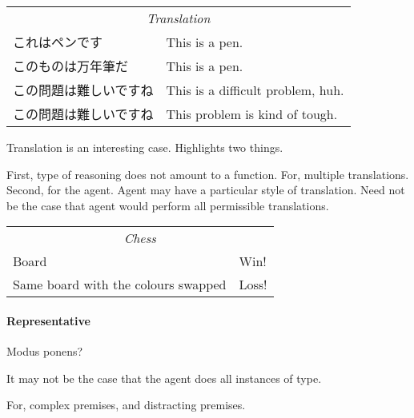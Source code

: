 \begin{note}
  \begin{center}
    \begin{tabular}[h]{p{.55\linewidth}|p{.4\linewidth}}
      \multicolumn{2}{c}{\emph{Translation}} \\
      これはペンです & This is a pen. \\
      このものは万年筆だ & This is a pen. \\
      この問題は難しいですね & This is a difficult problem, huh. \\
      この問題は難しいですね & This problem is kind of tough. \\
    \end{tabular}
  \end{center}

  Translation is an interesting case.
  Highlights two things.

  First, type of reasoning does not amount to a function.
  For, multiple translations.
  Second, for the agent.
  Agent may have a particular style of translation.
  Need not be the case that agent would perform all permissible translations.
\end{note}

\begin{note}
  \begin{center}
    \begin{tabular}[h]{p{.55\linewidth}|p{.4\linewidth}}
      \multicolumn{2}{c}{\emph{Chess}} \\
      Board & Win! \\
      Same board with the colours swapped & Loss! \\
    \end{tabular}
  \end{center}
\end{note}

\paragraph{Representative}

\begin{note}
  Modus ponens?

  It may not be the case that the agent does all instances of type.

  For, complex premises, and distracting premises.
\end{note}

